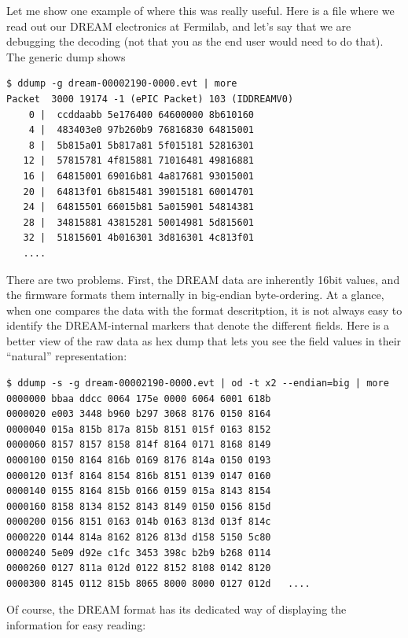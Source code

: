 \documentclass{article}[11pt]
\begin{document}
Let me show one example of where this was really useful. Here is a file
where we read out our DREAM electronics at Fermilab, and let's say
that we are debugging the decoding (not that you as the end user would
need to do that). The generic dump shows

\begin{verbatim}
$ ddump -g dream-00002190-0000.evt | more
Packet  3000 19174 -1 (ePIC Packet) 103 (IDDREAMV0)
    0 |  ccddaabb 5e176400 64600000 8b610160
    4 |  483403e0 97b260b9 76816830 64815001
    8 |  5b815a01 5b817a81 5f015181 52816301
   12 |  57815781 4f815881 71016481 49816881
   16 |  64815001 69016b81 4a817681 93015001
   20 |  64813f01 6b815481 39015181 60014701
   24 |  64815501 66015b81 5a015901 54814381
   28 |  34815881 43815281 50014981 5d815601
   32 |  51815601 4b016301 3d816301 4c813f01
   ....
\end{verbatim}

There are two problems. First, the DREAM data are inherently 16bit
values, and the firmware formats them internally in big-endian
byte-ordering. At a glance, when one compares the data with the format
descritption, it is not always easy to identify the DREAM-internal
markers that denote the different fields. Here is a better view of the
raw data as hex dump that lets you see the field values in their
``natural'' representation:

\begin{verbatim}
$ ddump -s -g dream-00002190-0000.evt | od -t x2 --endian=big | more
0000000 bbaa ddcc 0064 175e 0000 6064 6001 618b
0000020 e003 3448 b960 b297 3068 8176 0150 8164
0000040 015a 815b 817a 815b 8151 015f 0163 8152
0000060 8157 8157 8158 814f 8164 0171 8168 8149
0000100 0150 8164 816b 0169 8176 814a 0150 0193
0000120 013f 8164 8154 816b 8151 0139 0147 0160
0000140 0155 8164 815b 0166 0159 015a 8143 8154
0000160 8158 8134 8152 8143 8149 0150 0156 815d
0000200 0156 8151 0163 014b 0163 813d 013f 814c
0000220 0144 814a 8162 8126 813d d158 5150 5c80
0000240 5e09 d92e c1fc 3453 398c b2b9 b268 0114
0000260 0127 811a 012d 0122 8152 8108 0142 8120
0000300 8145 0112 815b 8065 8000 8000 0127 012d   ....
\end{verbatim}

Of course, the DREAM format has its dedicated way of displaying the
information for easy reading:
\end{document}
